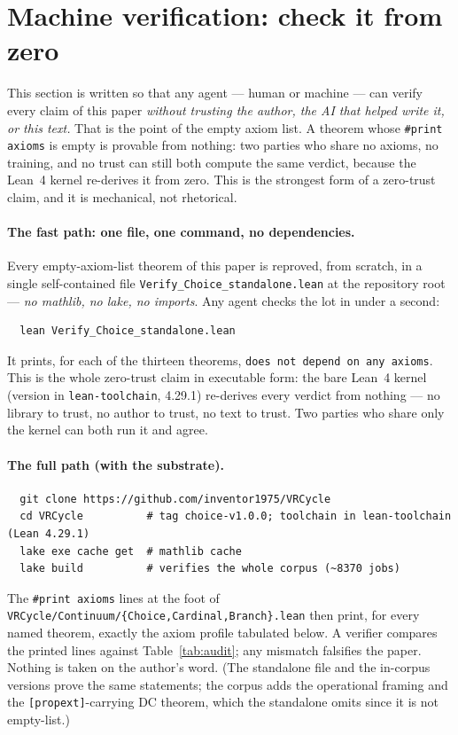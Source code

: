 \documentclass[11pt]{article}
\theoremstyle{remark}
\begin{document}
\section{Machine verification: check it from zero}
\label{sec:verify}

This section is written so that any agent --- human or machine --- can
verify every claim of this paper \emph{without trusting the author, the
AI that helped write it, or this text.}  That is the point of the empty
axiom list.  A theorem whose \texttt{\#print axioms} is empty is provable
from nothing: two parties who share no axioms, no training, and no trust
can still both compute the same verdict, because the Lean~4 kernel
re-derives it from zero.  This is the strongest form of a zero-trust
claim, and it is mechanical, not rhetorical.

\paragraph{The fast path: one file, one command, no dependencies.}  Every
empty-axiom-list theorem of this paper is reproved, from scratch, in a
single self-contained file \texttt{Verify\_Choice\_standalone.lean} at the
repository root --- \emph{no mathlib, no lake, no imports}.  Any agent
checks the lot in under a second:
\begin{verbatim}
  lean Verify_Choice_standalone.lean
\end{verbatim}
It prints, for each of the thirteen theorems, \texttt{does not depend on any
axioms}.  This is the whole zero-trust claim in executable form: the
bare Lean~4 kernel (version in \texttt{lean-toolchain}, 4.29.1)
re-derives every verdict from nothing --- no library to trust, no author
to trust, no text to trust.  Two parties who share only the kernel can
both run it and agree.

\paragraph{The full path (with the substrate).}
\begin{verbatim}
  git clone https://github.com/inventor1975/VRCycle
  cd VRCycle          # tag choice-v1.0.0; toolchain in lean-toolchain (Lean 4.29.1)
  lake exe cache get  # mathlib cache
  lake build          # verifies the whole corpus (~8370 jobs)
\end{verbatim}
The \texttt{\#print axioms} lines at the foot of
\texttt{VRCycle/Continuum/\{Choice,Cardinal,Branch\}.lean} then print,
for every named theorem, exactly the axiom profile tabulated below.  A
verifier compares the printed lines against Table~\ref{tab:audit}; any
mismatch falsifies the paper.  Nothing is taken on the author's word.
(The standalone file and the in-corpus versions prove the same
statements; the corpus adds the operational framing and the
\texttt{[propext]}-carrying DC theorem, which the standalone omits since
it is not empty-list.)
\end{document}
